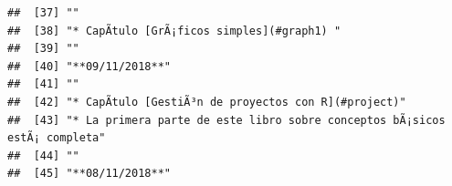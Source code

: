 \documentclass[
]{book}
\begin{document}
\begin{verbatim}
##  [37] ""                                                                                                                                                                                                                                                                                                        
##  [38] "* CapÃ­tulo [GrÃ¡ficos simples](#graph1) "                                                                                                                                                                                                                                                               
##  [39] ""                                                                                                                                                                                                                                                                                                        
##  [40] "**09/11/2018**"                                                                                                                                                                                                                                                                                          
##  [41] ""                                                                                                                                                                                                                                                                                                        
##  [42] "* CapÃ­tulo [GestiÃ³n de proyectos con R](#project)"                                                                                                                                                                                                                                                     
##  [43] "* La primera parte de este libro sobre conceptos bÃ¡sicos estÃ¡ completa"                                                                                                                                                                                                                                
##  [44] ""                                                                                                                                                                                                                                                                                                        
##  [45] "**08/11/2018**"                                                                                                                                                                                                                                                                                          

\end{verbatim}
\end{document}
